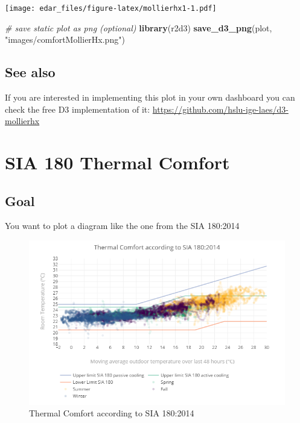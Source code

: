 \documentclass[
  a4paperpaper,
]{book}
\newenvironment{Shaded}{\begin{snugshade}}{\end{snugshade}}
\newcommand{\CommentTok}[1]{\textcolor[rgb]{0.56,0.35,0.01}{\textit{#1}}}
\newcommand{\KeywordTok}[1]{\textcolor[rgb]{0.13,0.29,0.53}{\textbf{#1}}}
\newcommand{\NormalTok}[1]{#1}
\newcommand{\StringTok}[1]{\textcolor[rgb]{0.31,0.60,0.02}{#1}}
\let\oldShaded\Shaded
\let\endoldShaded\endShaded
\renewenvironment{Shaded}{\footnotesize\oldShaded}{\endoldShaded}
\begin{document}
\texttt{[image: edar\_files/figure-latex/mollierhx1-1.pdf]}

\begin{Shaded}
\begin{Highlighting}[]
\CommentTok{# save static plot as png (optional)}
\KeywordTok{library}\NormalTok{(r2d3)}
\KeywordTok{save_d3_png}\NormalTok{(plot, }\StringTok{"images/comfortMollierHx.png"}\NormalTok{)}
\end{Highlighting}
\end{Shaded}

\hypertarget{see-also}{%
\subsection{See also}\label{see-also}}

If you are interested in implementing this plot in your own dashboard you can check the free D3 implementation of it:
\url{https://github.com/hslu-ige-laes/d3-mollierhx}

\newpage

\hypertarget{sia-180-thermal-comfort}{%
\section{SIA 180 Thermal Comfort}\label{sia-180-thermal-comfort}}

\hypertarget{goal-13}{%
\subsection{Goal}\label{goal-13}}

You want to plot a diagram like the one from the SIA 180:2014

\begin{figure}
\includegraphics[width=0.7\linewidth]{images/comfortSia180ThermCmf} \caption{Thermal Comfort according to SIA 180:2014}\label{fig:unnamed-chunk-22}
\end{figure}
\end{document}
